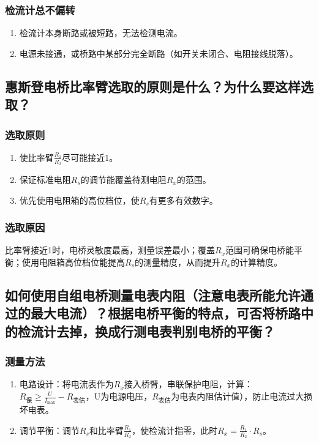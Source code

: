 \documentclass[]{../template/Report}%
\begin{document}
\begin{fullreportonly}
\subsubsection{检流计总不偏转}
\begin{enumerate}
   \item 检流计本身断路或被短路，无法检测电流。
   \item 电源未接通，或桥路中某部分完全断路（如开关未闭合、电阻接线脱落）。
\end{enumerate}
\subsection{惠斯登电桥比率臂选取的原则是什么？为什么要这样选取？}
\subsubsection{选取原则}
\begin{enumerate}
   \item 使比率臂\(\frac{R_1}{R_2}\)尽可能接近1。
   \item 保证标准电阻\(R_s\)的调节能覆盖待测电阻\(R_x\)的范围。
   \item 优先使用电阻箱的高位档位，使\(R_s\)有更多有效数字。
\end{enumerate}

\subsubsection{选取原因}
比率臂接近1时，电桥灵敏度最高，测量误差最小；覆盖\(R_x\)范围可确保电桥能平衡；使用电阻箱高位档位能提高\(R_s\)的测量精度，从而提升\(R_x\)的计算精度。
\subsection{如何使用自组电桥测量电表内阻（注意电表所能允许通过的最大电流）？根据电桥平衡的特点，可否将桥路中的检流计去掉，换成行测电表判别电桥的平衡？}
\subsubsection{测量方法}
\begin{enumerate}
    \item 电路设计：将电流表作为\(R_x\)接入桥臂，串联保护电阻，计算：\(R_{\text{保}}\geq\frac{U}{I_{\text{max}}} - R_{\text{表估}}\)，U为电源电压，\(R_{\text{表估}}\)为电表内阻估计值），防止电流过大损坏电表。
    \item 调节平衡：调节\(R_s\)和比率臂\(\frac{R_1}{R_2}\)，使检流计指零，此时\(R_x=\frac{R_1}{R_2} \cdot R_s\)。
\end{enumerate}

\end{fullreportonly}
\end{document}
